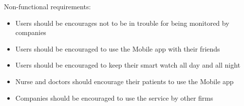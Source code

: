 Non-functional requirements:
\begin{itemize}
    \item Users should be encourages not to be in trouble for being monitored by companies
    \item Users should be encouraged to use the Mobile app with their friends
    \item Users should be encouraged to keep their smart watch all day and all night
    \item Nurse and doctors should encourage their patients to use the Mobile app 
    \item Companies should be encouraged to use the service by other firms
\end{itemize}